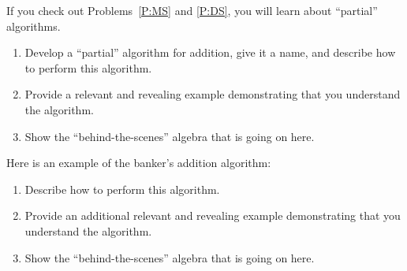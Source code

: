 \documentclass[nooutcomes]{ximera}
\begin{document}
\begin{problem}If you check out Problems~\ref{P:MS} and \ref{P:DS}, you will
  learn about ``partial'' algorithms.
\begin{enumerate}
\item Develop a ``partial'' algorithm for addition, give it a name, and describe how to
  perform this algorithm.
\item Provide a relevant and revealing example demonstrating that you
  understand the algorithm.
\item Show the ``behind-the-scenes'' algebra that is going on here.
\end{enumerate}
\end{problem} 

\begin{problem}Here is an example of the banker's addition
  algorithm:
\begin{image}
\end{image}
\begin{enumerate}
\item Describe how to perform this algorithm.
\item Provide an additional relevant and revealing example
  demonstrating that you understand the algorithm.
\item Show the ``behind-the-scenes'' algebra that is going on here.
\end{enumerate}
\end{problem} 
\end{document}

